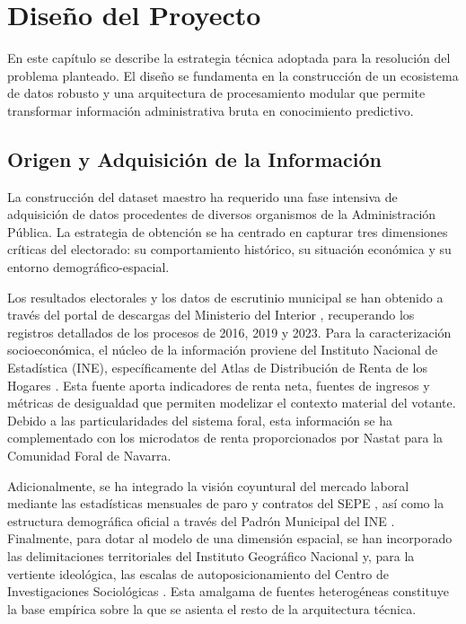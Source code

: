 \chapter{Diseño del Proyecto}

En este capítulo se describe la estrategia técnica adoptada para la resolución del problema planteado. El diseño se fundamenta en la construcción de un ecosistema de datos robusto y una arquitectura de procesamiento modular que permite transformar información administrativa bruta en conocimiento predictivo.

\section{Origen y Adquisición de la Información}

La construcción del dataset maestro ha requerido una fase intensiva de adquisición de datos procedentes de diversos organismos de la Administración Pública. La estrategia de obtención se ha centrado en capturar tres dimensiones críticas del electorado: su comportamiento histórico, su situación económica y su entorno demográfico-espacial.

Los resultados electorales y los datos de escrutinio municipal se han obtenido a través del portal de descargas del Ministerio del Interior \cite{interior_votos}, recuperando los registros detallados de los procesos de 2016, 2019 y 2023. Para la caracterización socioeconómica, el núcleo de la información proviene del Instituto Nacional de Estadística (INE), específicamente del Atlas de Distribución de Renta de los Hogares \cite{ine_renta}. Esta fuente aporta indicadores de renta neta, fuentes de ingresos y métricas de desigualdad que permiten modelizar el contexto material del votante. Debido a las particularidades del sistema foral, esta información se ha complementado con los microdatos de renta proporcionados por Nastat \cite{nastat_navarra} para la Comunidad Foral de Navarra.

Adicionalmente, se ha integrado la visión coyuntural del mercado laboral mediante las estadísticas mensuales de paro y contratos del SEPE \cite{sepe_empleo}, así como la estructura demográfica oficial a través del Padrón Municipal del INE \cite{ine_padron}. Finalmente, para dotar al modelo de una dimensión espacial, se han incorporado las delimitaciones territoriales del Instituto Geográfico Nacional \cite{ign_geo} y, para la vertiente ideológica, las escalas de autoposicionamiento del Centro de Investigaciones Sociológicas \cite{cis_ideologia}. Esta amalgama de fuentes heterogéneas constituye la base empírica sobre la que se asienta el resto de la arquitectura técnica.

